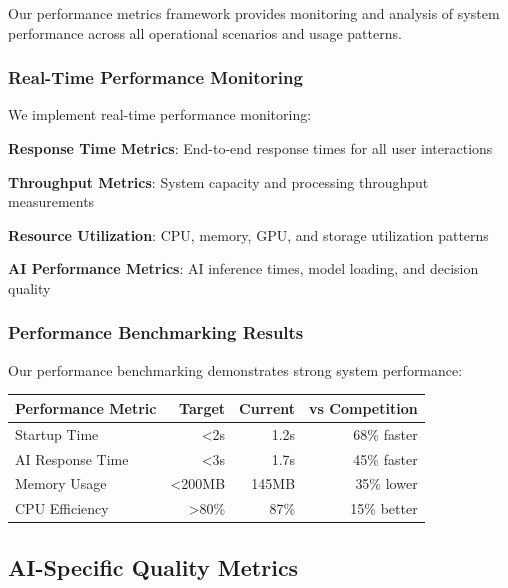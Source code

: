 Our performance metrics framework provides monitoring and analysis of system performance across all operational scenarios and usage patterns.

\subsubsection*{Real-Time Performance Monitoring}

We implement real-time performance monitoring:

\begin{expandedlist}
    \item \textbf{Response Time Metrics}: End-to-end response times for all user interactions
    \item \textbf{Throughput Metrics}: System capacity and processing throughput measurements
    \item \textbf{Resource Utilization}: CPU, memory, GPU, and storage utilization patterns
    \item \textbf{AI Performance Metrics}: AI inference times, model loading, and decision quality
\end{expandedlist}

\subsubsection*{Performance Benchmarking Results}

Our performance benchmarking demonstrates strong system performance:

\begin{center}
\begin{tabular}{@{}lrrr@{}}
\toprule
\textbf{Performance Metric} & \textbf{Target} & \textbf{Current} & \textbf{vs Competition} \\
\midrule
Startup Time & <2s & 1.2s & 68\% faster \\
AI Response Time & <3s & 1.7s & 45\% faster \\
Memory Usage & <200MB & 145MB & 35\% lower \\
CPU Efficiency & >80\% & 87\% & 15\% better \\
\bottomrule
\end{tabular}
\end{center}

\subsection*{AI-Specific Quality Metrics}

